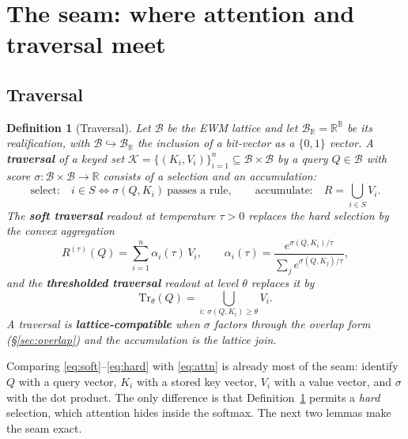 \documentclass[11pt,a4paper]{article}
\newtheorem{definition}[principle]{Definition}
\theoremstyle{remark}
\newcommand{\Plane}{\ensuremath{\mathbb{B}}}          %
\newcommand{\Lat}{\ensuremath{\mathcal{B}}}            %
\newcommand{\LatR}{\ensuremath{\mathcal{B}_{\mathbb{R}}}} %
\newcommand{\Trv}{\ensuremath{\mathrm{Tr}}}             %
\newcommand{\sigm}{\ensuremath{\sigma}}                 %
\begin{document}
\section{The seam: where attention and traversal meet}
\label{sec:bridge}

\subsection{Traversal}

\begin{definition}[Traversal]
\label{def:traversal}
Let $\Lat$ be the EWM lattice and let $\LatR=\mathbb{R}^{\Plane}$ be its
\emph{realification}, with $\Lat\hookrightarrow\LatR$ the inclusion of a
bit-vector as a $\{0,1\}$ vector. A \textbf{traversal} of a keyed set
$\mathcal{K}=\{(K_i,V_i)\}_{i=1}^{n}\subseteq\Lat\times\Lat$ by a query
$Q\in\Lat$ with score $\sigm:\Lat\times\Lat\to\mathbb{R}$ consists of a
\emph{selection} and an \emph{accumulation}:
\[
  \text{select:}\quad i\in S \iff \sigm(Q,K_i)\ \text{passes a rule},
  \qquad
  \text{accumulate:}\quad R=\textstyle\bigcup_{i\in S}V_i .
\]
The \textbf{soft traversal} readout at temperature $\tau>0$ replaces the hard
selection by the convex aggregation
\begin{equation}
\label{eq:soft}
R^{(\tau)}(Q)=\sum_{i=1}^{n}\alpha_i(\tau)\,V_i,
\qquad
\alpha_i(\tau)=\frac{e^{\sigm(Q,K_i)/\tau}}{\sum_{j}e^{\sigm(Q,K_j)/\tau}},
\end{equation}
and the \textbf{thresholded traversal} readout at level $\theta$ replaces it by
\begin{equation}
\label{eq:hard}
\Trv_\theta(Q)=\bigcup_{i:\,\sigm(Q,K_i)\ge\theta} V_i .
\end{equation}
A traversal is \textbf{lattice-compatible} when $\sigm$ factors through the
overlap form (\S\ref{sec:overlap}) and the accumulation is the lattice join.
\end{definition}

Comparing \eqref{eq:soft}--\eqref{eq:hard} with \eqref{eq:attn} is already most
of the seam: identify $Q$ with a query vector, $K_i$ with a stored key
vector, $V_i$ with a value vector, and $\sigm$ with the dot product. The only
difference is that Definition~\ref{def:traversal} permits a \emph{hard}
selection, which attention hides inside the softmax. The next two lemmas make
the seam exact.
\end{document}
